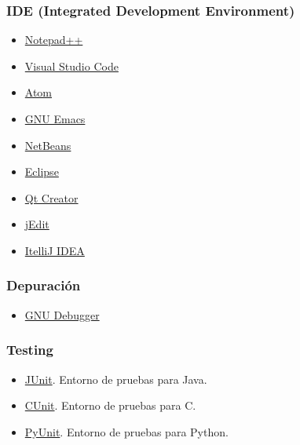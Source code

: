\subsubsection{IDE (Integrated Development Environment)}
\begin{multicols}{2}
\begin{itemize}
\item \href{https://notepad-plus-plus.org/}{Notepad++}
\item \href{https://code.visualstudio.com/}{Visual Studio Code}
\item \href{https://atom.io/}{Atom}
\item \href{https://www.gnu.org/s/emacs/}{GNU Emacs}
\item \href{https://netbeans.org/}{NetBeans}
\item \href{https://eclipse.org/}{Eclipse}
\item \href{https://www.qt.io/ide/}{Qt Creator}
\item \href{http://www.jedit.org/}{jEdit}
\item \href{https://www.jetbrains.com/idea/}{ItelliJ IDEA}
\end{itemize}
\end{multicols}



\subsubsection{Depuración}
\begin{itemize}
\item \href{https://www.gnu.org/s/gdb/}{GNU Debugger}
\end{itemize}


\subsubsection{Testing}
\begin{multicols}{2}
\begin{itemize}
\item \href{http://junit.org}{JUnit}. Entorno de pruebas para Java.
\item \href{http://cunit.sourceforge.net/}{CUnit}. Entorno de pruebas para C.
\item \href{https://wiki.python.org/moin/PyUnit}{PyUnit}. Entorno de pruebas para Python.
\end{itemize}
\end{multicols}

